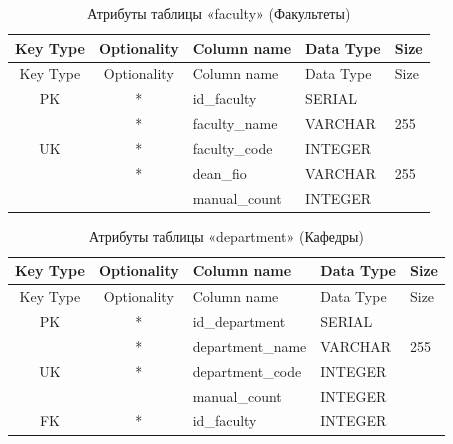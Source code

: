 \begin{xltabular}{\textwidth}{|c|c|l|l|X|}
	\caption{Атрибуты таблицы «faculty» (Факультеты)\label{tab:faculty}}\\ \hline
	\centrow Key Type & \centrow Optionality & \centrow Column name & \centrow Data Type & \centrow Size \\ \hline
	\endfirsthead
	
	\centrow Key Type & \centrow Optionality & \centrow Column name & \centrow Data Type & \centrow Size \\ \hline
	\endhead
	
	PK & * & id\_faculty & SERIAL & \\ \hline
	& * & faculty\_name & VARCHAR & 255 \\ \hline
	UK & * & faculty\_code & INTEGER & \\ \hline
	& * & dean\_fio & VARCHAR & 255 \\ \hline
	&  & manual\_count & INTEGER & \\ \hline
\end{xltabular}

\begin{xltabular}{\textwidth}{|c|c|l|l|X|}
	\caption{Атрибуты таблицы «department» (Кафедры)\label{tab:department}}\\ \hline
	\centrow Key Type & \centrow Optionality & \centrow Column name & \centrow Data Type & \centrow Size \\ \hline
	\endfirsthead
	
	\centrow Key Type & \centrow Optionality & \centrow Column name & \centrow Data Type & \centrow Size \\ \hline
	\endhead
	
	PK & * & id\_department & SERIAL & \\ \hline
	& * & department\_name & VARCHAR & 255 \\ \hline
	UK & * & department\_code & INTEGER & \\ \hline
	&  & manual\_count & INTEGER & \\ \hline
	FK & * & id\_faculty & INTEGER & \\ \hline
\end{xltabular}

